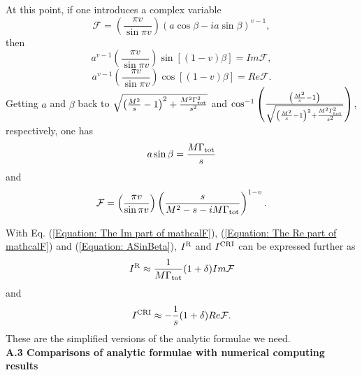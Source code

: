 \documentclass[a4paper,10pt,twoside]{cpc-hepnp}
\begin{document}
\begin{CJK*}{UTF8}{gbsn}
\begin{small}
\begin{multicols}{2}
		At this point, if one introduces a complex variable
		\begin{equation}
			\mathcal{F} = \left( \frac{\pi v}{\sin\pi v} \right) (a\cos\beta - i a\sin\beta)^{v-1},
		\end{equation}
		then
		\begin{equation}
			a^{v-1} \left(\frac{\pi v}{\sin\pi v}\right) \sin[(1-v)\beta] = Im\mathcal{F},
			\label{Equation: The Im part of mathcalF}
		\end{equation}
		\begin{equation}
			a^{v-1} \left(\frac{\pi v}{\sin\pi v}\right) \cos[(1-v)\beta] = Re\mathcal{F}.
			\label{Equation: The Re part of mathcalF}
		\end{equation}
		Getting $a$ and $\beta$ back to $\sqrt{\left(\frac{M^2}{s}-1\right)^2+\frac{M^2\Gamma_{\rm tot}^2}{s^2}}$ and $\cos^{-1}\left(\frac{\left(\frac{M^2}{s}-1\right)}{\sqrt{\left(\frac{M^2}{s}-1\right)^2+\frac{M^2\Gamma_{\rm tot}^2}{s^2}}}\right)$, respectively, one has
		\begin{equation}
			a \sin\beta=\frac{M\Gamma_{\rm tot}}{s}
			\label{Equation: ASinBeta}
		\end{equation}
		and
		\begin{equation}
			\mathcal{F} = \left( \frac{\pi v}{\sin\pi v} \right) \left(\frac{s}{M^2 - s - i M\Gamma_{\rm tot}}\right)^{1-v}.
			\label{Equation: The expressions of mathcalF.}
		\end{equation}
		
		With Eq. (\ref{Equation: The Im part of mathcalF}), (\ref{Equation: The Re part of mathcalF}) and (\ref{Equation: ASinBeta}), $I^{\rm R}$ and $I^{\rm CRI}$ can be expressed further as
		\begin{equation}
			I^{\rm R} \approx \frac{1}{M \Gamma_{\rm tot}} (1+\delta) Im\mathcal{F} \label{Equation: The approximate results 1}
		\end{equation}
		and
		\begin{equation}
			I^{\rm CRI} \approx - \frac{1}{s} (1+\delta) Re\mathcal{F}. \label{Equation: The approximate results 2}
		\end{equation}
		These are the simplified versions of the analytic formulae we need. \\
		
		\noindent \textbf{A.3 Comparisons of analytic formulae with numerical computing results} \\
		

\end{multicols}
\end{small}
\end{CJK*}
\end{document}
